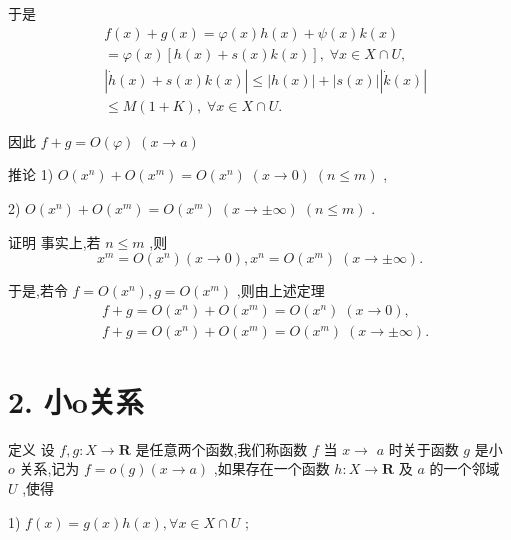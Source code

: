 于是
\begin{align*}
	&f\left( x\right)  + g\left( x\right)  = \varphi \left( x\right) h\left( x\right)  + \psi \left( x\right) k\left( x\right)\\
	&= \varphi \left( x\right) \left\lbrack  {h\left( x\right)  + s\left( x\right) k\left( x\right) }\right\rbrack  ,\;\forall x \in  X \cap  U,\\
	&\left| {\dot{h}\left( x\right)  + s\left( x\right) k\left( x\right) }\right|  \leq  \left| {h\left( x\right) }\right|  + \left| {s\left( x\right) }\right| \left| {\dot{k}\left( x\right) }\right|\\
	&\leq  M\left( {1 + K}\right) ,\;\forall x \in  X \cap  U.
\end{align*}

因此 $f + g = O\left( \varphi \right) \;\left( {x \rightarrow  a}\right)$

推论 1) $O\left( {x}^{n}\right)  + O\left( {x}^{m}\right)  = O\left( {x}^{n}\right) \;\left( {x \rightarrow  0}\right) \;\left( {n \leq  m}\right)$ ,

2) $O\left( {x}^{n}\right)  + O\left( {x}^{m}\right)  = O\left( {x}^{m}\right) \;\left( {x \rightarrow   \pm  \infty }\right) \;\left( {n \leq  m}\right)$ .

证明 事实上,若 $n \leq  m$ ,则
$${x}^{m} = O\left( {x}^{n}\right) \left( {x \rightarrow  0}\right) ,{x}^{n} = O\left( {x}^{m}\right) \;\left( {x \rightarrow   \pm  \infty }\right) .$$

于是,若令 $f = O\left( {x}^{n}\right) ,g = O\left( {x}^{m}\right)$ ,则由上述定理
\begin{align*}
	&f + g = O\left( {x}^{n}\right)  + O\left( {x}^{m}\right)  = O\left( {x}^{n}\right) \;\left( {x \rightarrow  0}\right) ,\\
	&f + g = O\left( {x}^{n}\right)  + O\left( {x}^{m}\right)  = O\left( {x}^{m}\right) \;\left( {x \rightarrow   \pm  \infty }\right) .
\end{align*}

\section*{2. 小o关系}

定义 设 $f,g : X \rightarrow  \mathbf{R}$ 是任意两个函数,我们称函数 $f$ 当 $x \rightarrow$  $a$ 时关于函数 $g$ 是小 $o$ 关系,记为 $f = o\left( g\right) \left( {x \rightarrow  a}\right)$ ,如果存在一个函数 $h : X \rightarrow  \mathbf{R}$ 及 $a$ 的一个邻域 $U$ ,使得

1) $f\left( x\right)  = g\left( x\right) h\left( x\right) ,\forall x \in  X \cap  U$ ;


